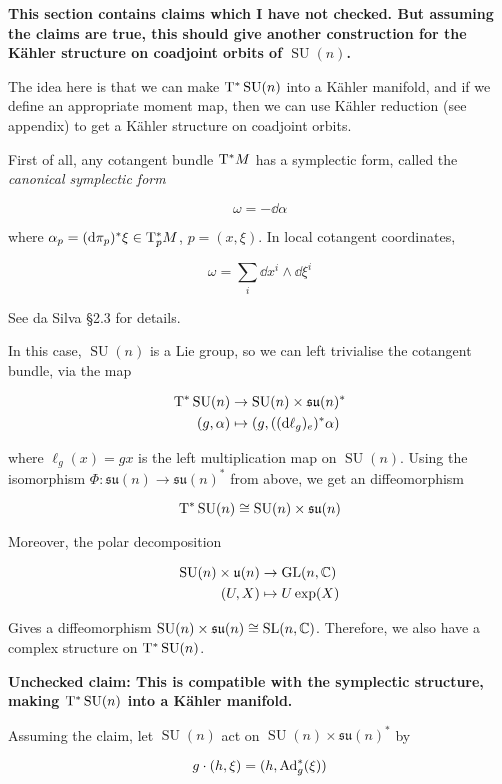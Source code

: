 \documentclass{article}
\DeclareMathOperator{\SU}{SU}
\newcommand{\su}{\mathfrak{su}}
\begin{document}
\textbf{This section contains claims which I have not checked. But assuming the claims are true, this should give another construction for the K\"ahler structure on coadjoint orbits of \(\SU(n)\).}

The idea here is that we can make \(\T^*\SU(n)\) into a K\"ahler manifold, and if we define an appropriate moment map, then we can use K\"ahler reduction (see appendix) to get a K\"ahler structure on coadjoint orbits.

First of all, any cotangent bundle \(\mathrm{T}^*M\) has a symplectic form, called the \emph{canonical symplectic form}

\[\omega = -\dd\alpha\]

where \(\alpha_p = (\dd\pi_p)^*\xi \in \mathrm{T}_p^*M\), \(p = (x, \xi)\). In local cotangent coordinates,

\[\omega = \sum_i \dd x^i \wedge \dd \xi^i\]

See da Silva \S 2.3 for details.

In this case, \(\SU(n)\) is a Lie group, so we can left trivialise the cotangent bundle, via the map

\begin{align*}
    \TT^*\SU(n) &\to \SU(n) \times \su(n)^* \\
    (g, \alpha) &\mapsto (g, ((\dd\ell_g)_e)^*\alpha) 
\end{align*}

where \(\ell_g(x) = gx\) is the left multiplication map on \(\SU(n)\). Using the isomorphism \(\Phi : \su(n) \to \su(n)^*\) from above, we get an diffeomorphism

\[\T^* \SU(n) \cong \SU(n)\times \su(n)\]

Moreover, the polar decomposition

\begin{align*}
    \SU(n) \times \mfu(n) &\to \GL(n, \C) \\
    (U, X) &\mapsto U \exp(X)
\end{align*}

Gives a diffeomorphism \(\SU(n) \times \su(n) \cong \SL(n, \C)\). Therefore, we also have a complex structure on \(\T^*\SU(n)\). 

\textbf{Unchecked claim: This is compatible with the symplectic structure, making \(\T^*\SU(n)\) into a K\"ahler manifold.}

Assuming the claim, let \(\SU(n)\) act on \(\SU(n) \times \su(n)^*\) by

\[g \cdot (h, \xi) = (h, \operatorname{Ad}_g^*(\xi))\]
\end{document}
